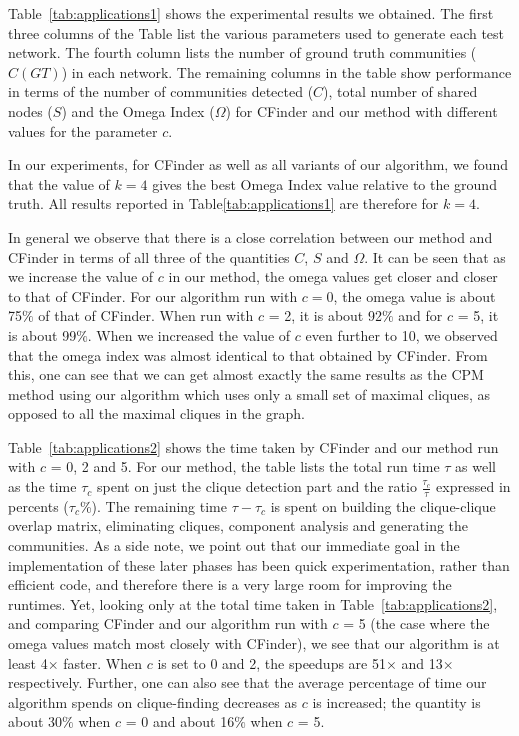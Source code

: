 


Table~\ref{tab:applications1} shows the experimental results we obtained.
The first three columns of the Table list the various parameters used to generate each test network. The fourth column lists the number of ground truth communities ($C(GT)$) in each network.  The remaining columns in the table show performance 
in terms of the number of communities detected ($C$), 
total number of shared nodes ($S$) and the Omega Index ($\Omega$) for 
CFinder and our method with different values for the parameter $c$.

In our experiments, for CFinder as well as all variants of our algorithm, 
we found that the value of $k=4$ gives the best Omega Index value relative 
to the ground truth. All results reported in Table\ref{tab:applications1} are therefore
for $k=4$.

In general we observe that there is a close correlation between our method and CFinder
in terms of all three of the quantities $C$, $S$ and $\Omega$. It can be seen that as we increase the value of $c$ in our method, the omega values get closer and closer to that of CFinder. For our algorithm run with $c=0$, the omega value is about 75$\%$ of that of CFinder. When run with $c$ = 2, it is about 92$\%$ and for $c$ = 5, it is about 99$\%$. When we increased the value of $c$ even further to 10, we observed that the omega index was almost identical to that obtained by CFinder. From this, one can see that we can get almost exactly the same results as the CPM method using our algorithm which uses only a small set of 
maximal cliques, as opposed to all the maximal cliques in the graph.



Table~\ref{tab:applications2} shows the time taken by CFinder and our method 
run with $c$ = 0, 2 and 5. For our method, the table lists the total run time $\tau$ 
as well as the time $\tau_c$ spent on just the clique detection part and the ratio
$\frac{\tau_c}{\tau}$ expressed in percents ($\tau_c$\%).
The remaining time $\tau - \tau_c$ is spent on building the clique-clique overlap matrix, eliminating cliques, component analysis and generating the communities.  As a side note,
we point out that our immediate goal in the implementation of these later phases has been quick experimentation, rather than efficient code, and therefore there is a very large room for improving the runtimes. Yet, looking only at the total time taken in Table~\ref{tab:applications2}, and comparing CFinder and our algorithm run with $c$ = 5 (the case where the omega values match most closely with CFinder), we see that our algorithm is at least 4$\times$ faster. When $c$ is set to 0 and 2, the speedups are 51$\times$ and 13$\times$ respectively. Further, one can also see that the average percentage of time our algorithm spends on clique-finding decreases as $c$ is increased; the quantity is about 30$\%$ when $c$ = 0 and about 
16$\%$ when $c$ = 5.

